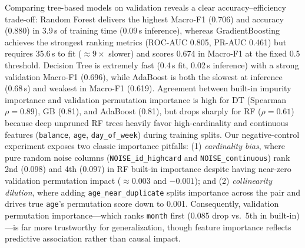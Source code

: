 
Comparing tree-based models on validation reveals a clear accuracy--efficiency trade-off: Random Forest delivers the highest Macro-F1 (0.706) and accuracy (0.880) in 3.9\,s of training time (0.09\,s inference), whereas GradientBoosting achieves the strongest ranking metrics (ROC-AUC 0.805, PR-AUC 0.461) but requires 35.6\,s to fit ($\approx 9\times$ slower) and scores 0.674 in Macro-F1 at the fixed 0.5 threshold. Decision Tree is extremely fast (0.4\,s fit, 0.02\,s inference) with a strong validation Macro-F1 (0.696), while AdaBoost is both the slowest at inference (0.68\,s) and weakest in Macro-F1 (0.619). Agreement between built-in impurity importance and validation permutation importance is high for DT (Spearman $\rho = 0.89$), GB (0.81), and AdaBoost (0.81), but drops sharply for RF ($\rho = 0.61$) because deep unpruned RF trees heavily favor high-cardinality and continuous features (\texttt{balance}, \texttt{age}, \texttt{day\_of\_week}) during training splits. Our negative-control experiment exposes two classic importance pitfalls: (1) \emph{cardinality bias}, where pure random noise columns (\texttt{NOISE\_id\_highcard} and \texttt{NOISE\_continuous}) rank 2nd (0.098) and 4th (0.097) in RF built-in importance despite having near-zero validation permutation impact ($\approx 0.003$ and $-0.001$); and (2) \emph{collinearity dilution}, where adding \texttt{age\_near\_duplicate} splits importance across the pair and drives true \texttt{age}'s permutation score down to 0.001. Consequently, validation permutation importance---which ranks \texttt{month} first (0.085 drop vs.\ 5th in built-in)---is far more trustworthy for generalization, though feature importance reflects predictive association rather than causal impact.
